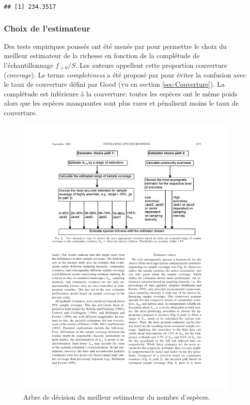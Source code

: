 \documentclass[
  11pt,
  american,
  a4paper,
  extrafontsizes,onecolumn,openright
  ]{memoir}
\begin{document}
\begin{verbatim}
## [1] 234.3517
\end{verbatim}

\normalsize

\hypertarget{sec-ChoixEstimateur}{%
\subsubsection{Choix de l'estimateur}\label{sec-ChoixEstimateur}}

Des tests empiriques poussés ont été menés par \textcite{Brose2003} pour permettre le choix du meilleur estimateur de la richesse en fonction de la complétude de l'échantillonnage \(f_{>0}/{S}\).
Les auteurs appellent cette proportion couverture (\emph{coverage}).
Le terme \emph{completeness} a été proposé par \textcite{Beck2010} pour éviter la confusion avec le taux de couverture défini par Good (vu en section \ref{sec-Couverture}).
La complétude est inférieure à la couverture: toutes les espèces ont le même poids alors que les espèces manquantes sont plus rares et pénalisent moins le taux de couverture.



\scriptsize

\begin{figure}

{\centering \includegraphics[width=0.8\linewidth]{images/Brose2003} 

}

\caption{Arbre de décision du meilleur estimateur du nombre d'espèces.}\label{fig:Brose2003}
\end{figure}
\end{document}
